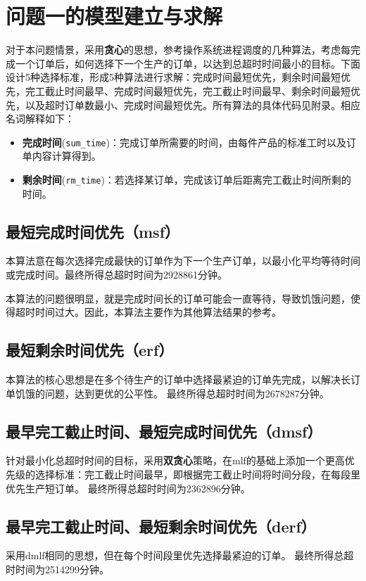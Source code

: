 \section{问题一的模型建立与求解}
对于本问题情景，采用\textbf{贪心}的思想，参考操作系统进程调度的几种算法，考虑每完成一个订单后，如何选择下一个生产的订单，以达到总超时时间最小的目标。下面设计5种选择标准，形成5种算法进行求解：完成时间最短优先，剩余时间最短优先，完工截止时间最早、完成时间最短优先，完工截止时间最早、剩余时间最短优先，以及超时订单数最小、完成时间最短优先。所有算法的具体代码见附录。相应名词解释如下：
\begin{itemize}
    \item \textbf{完成时间}(\verb|sum_time|)：完成订单所需要的时间，由每件产品的标准工时以及订单内容计算得到。
    \item \textbf{剩余时间}(\verb|rm_time|)：若选择某订单，完成该订单后距离完工截止时间所剩的时间。
\end{itemize}

      \subsection{最短完成时间优先（msf）}
      本算法意在每次选择完成最快的订单作为下一个生产订单，以最小化平均等待时间或完成时间。最终所得总超时时间为2928861分钟。
      
      本算法的问题很明显，就是完成时间长的订单可能会一直等待，导致饥饿问题，使得超时时间过大。因此，本算法主要作为其他算法结果的参考。
      
      \subsection{最短剩余时间优先（erf）}
      本算法的核心思想是在多个待生产的订单中选择最紧迫的订单先完成，以解决长订单饥饿的问题，达到更优的公平性。
      最终所得总超时时间为2678287分钟。
      
      \subsection{最早完工截止时间、最短完成时间优先（dmsf）}
      针对最小化总超时时间的目标，采用\textbf{双贪心}策略，在mlf的基础上添加一个更高优先级的选择标准：完工截止时间最早，即根据完工截止时间将时间分段，在每段里优先生产短订单。
      最终所得总超时时间为2362896分钟。
      \subsection{最早完工截止时间、最短剩余时间优先（derf）}
      采用dmlf相同的思想，但在每个时间段里优先选择最紧迫的订单。
      最终所得总超时时间为2514299分钟。
      

